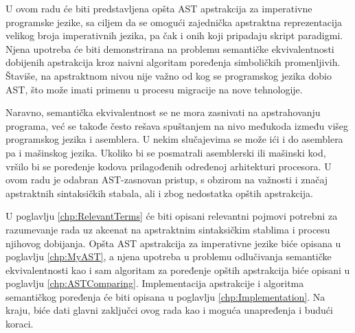 U ovom radu će biti predstavljena opšta AST apstrakcija za imperativne programske jezike, sa ciljem da se omogući zajednička apstraktna reprezentacija velikog broja imperativnih jezika, pa čak i onih koji pripadaju skript paradigmi. Njena upotreba će biti demonstrirana na problemu semantičke ekvivalentnosti dobijenih apstrakcija kroz naivni algoritam poređenja simboličkih promenljivih. Štaviše, na apstraktnom nivou nije važno od kog se programskog jezika dobio AST, što može imati primenu u procesu migracije na nove tehnologije.

Naravno, semantička ekvivalentnost se ne mora zasnivati na apstrahovanju programa, već se takođe često rešava spuštanjem na nivo međukoda između višeg programskog jezika i asemblera. U nekim slučajevima se može ići i do asemblera pa i mašinskog jezika. Ukoliko bi se posmatrali asemblerski ili mašinski kod, vršilo bi se poređenje kodova prilagođenih određenoj arhitekturi procesora. U ovom radu je odabran AST-zasnovan pristup, s obzirom na važnosti i značaj apstraktnih sintaksičkih stabala, ali i zbog nedostatka opštih apstrakcija.

U poglavlju \ref{chp:RelevantTerms} će biti opisani relevantni pojmovi potrebni za razumevanje rada uz akcenat na apstraktnim sintaksičkim stablima i procesu njihovog dobijanja. Opšta AST apstrakcija za imperativne jezike biće opisana u poglavlju \ref{chp:MyAST}, a njena upotreba u problemu odlučivanja semantičke ekvivalentnosti kao i sam algoritam za poređenje opštih apstrakcija biće opisani u poglavlju \ref{chp:ASTComparing}. Implementacija apstrakcije i algoritma semantičkog poređenja će biti opisana u poglavlju \ref{chp:Implementation}. Na kraju, biće dati glavni zaključci ovog rada kao i moguća unapređenja i budući koraci. 
